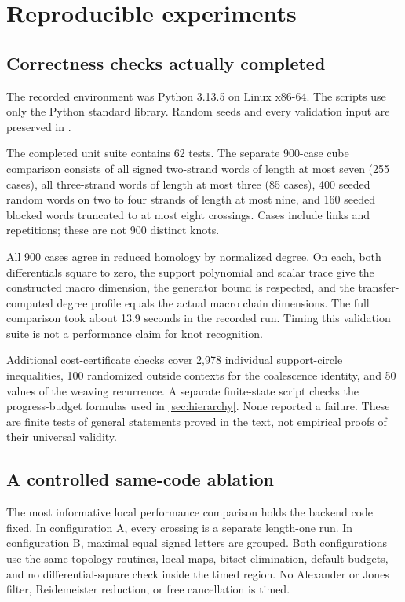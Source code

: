 \documentclass[11pt,letterpaper]{article}
\theoremstyle{definition}
\newcommand{\code}[1]{\texttt{\detokenize{#1}}}
\begin{document}
\section{Reproducible experiments}\label{sec:experiments}
\subsection{Correctness checks actually completed}
The recorded environment was Python 3.13.5 on Linux x86-64. The scripts use only the Python standard library. Random seeds and every validation input are preserved in \code{results/validation.json}.

The completed unit suite contains 62 tests. The separate 900-case cube comparison consists of all signed two-strand words of length at most seven (255 cases), all three-strand words of length at most three (85 cases), 400 seeded random words on two to four strands of length at most nine, and 160 seeded blocked words truncated to at most eight crossings. Cases include links and repetitions; these are not 900 distinct knots.

All 900 cases agree in reduced homology by normalized degree. On each, both differentials square to zero, the support polynomial and scalar trace give the constructed macro dimension, the generator bound is respected, and the transfer-computed degree profile equals the actual macro chain dimensions. The full comparison took about 13.9 seconds in the recorded run. Timing this validation suite is not a performance claim for knot recognition.

Additional cost-certificate checks cover 2,978 individual support-circle inequalities, 100 randomized outside contexts for the coalescence identity, and 50 values of the weaving recurrence. A separate finite-state script checks the progress-budget formulas used in \cref{sec:hierarchy}. None reported a failure. These are finite tests of general statements proved in the text, not empirical proofs of their universal validity.

\subsection{A controlled same-code ablation}
The most informative local performance comparison holds the backend code fixed. In configuration A, every crossing is a separate length-one run. In configuration B, maximal equal signed letters are grouped. Both configurations use the same topology routines, local maps, bitset elimination, default budgets, and no differential-square check inside the timed region. No Alexander or Jones filter, Reidemeister reduction, or free cancellation is timed.
\end{document}
